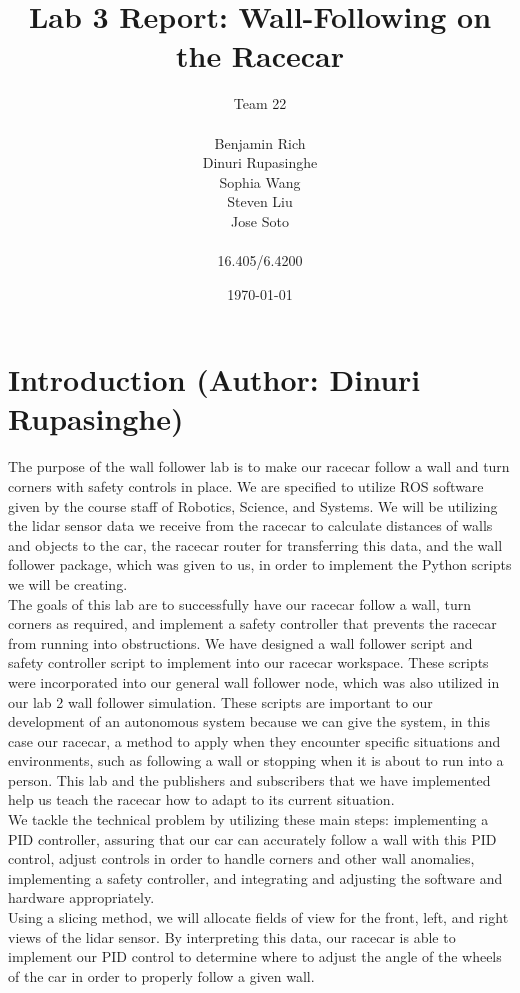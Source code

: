\documentclass{article}
\title{Lab 3 Report: Wall-Following on the Racecar} %
\author{Team 22 \\\\ Benjamin Rich \\ Dinuri Rupasinghe \\ Sophia Wang \\ Steven Liu \\ Jose Soto \\\\ 16.405/6.4200} %
\date{\today} %
\begin{document}
\maketitle


\tableofcontents
\newpage


\section{Introduction (Author: Dinuri Rupasinghe)}
The purpose of the wall follower lab is to make our racecar follow a wall and turn corners with safety controls in place. We are specified to utilize ROS software given by the course staff of Robotics, Science, and Systems. We will be utilizing the lidar sensor data we receive from the racecar to calculate distances of walls and objects to the car, the racecar router for transferring this data, and the wall follower package, which was given to us, in order to implement the Python scripts we will be creating.\\

The goals of this lab are to successfully have our racecar follow a wall, turn corners as required, and implement a safety controller that prevents the racecar from running into obstructions. We have designed a wall follower script and safety controller script to implement into our racecar workspace. These scripts were incorporated into our general wall follower node, which was also utilized in our lab 2 wall follower simulation. These scripts are important to our development of an autonomous system because we can give the system, in this case our racecar, a method to apply when they encounter specific situations and environments, such as following a wall or stopping when it is about to run into a person. This lab and the publishers and subscribers that we have implemented help us teach the racecar how to adapt to its current situation.\\

We tackle the technical problem by utilizing these main steps: implementing a PID controller, assuring that our car can accurately follow a wall with this PID control, adjust controls in order to handle corners and other wall anomalies, implementing a safety controller, and integrating and adjusting the software and hardware appropriately.\\

Using a slicing method, we will allocate fields of view for the front, left, and right views of the lidar sensor. By interpreting this data, our racecar is able to implement our PID control to determine where to adjust the angle of the wheels of the car in order to properly follow a given wall. \\
\end{document}
